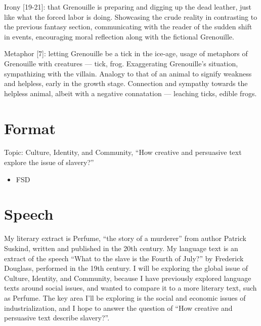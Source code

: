 \documentclass[a4paper,12pt]{article}
\begin{document}
Irony [19-21]: that Grenouille is preparing and digging up the dead leather, just like what the forced labor is doing. Showcasing the crude reality in contrasting to the previous fantasy section, communicating with the reader of the sudden shift in events, encouraging moral reflection along with the fictional Grenouille.

Metaphor [7]: letting Grenouille be a tick in the ice-age, usage of metaphors of Grenouille with creatures --- tick, frog. Exaggerating Grenouille's situation, sympathizing with the villain. Analogy to that of an animal to signify weakness and helpless, early in the growth stage. Connection and sympathy towards the helpless animal, albeit with a negative connatation --- leaching ticks, edible frogs.

\section{Format}

Topic: Culture, Identity, and Community, ``How creative and persuasive text explore the issue of slavery?''
\begin{itemize}
    \item FSD
\end{itemize}

\section{Speech}
My literary extract is Perfume, ``the story of a murderer'' from author Patrick Suskind, written and published in the 20th century. My language text is an extract of the speech ``What to the slave is the Fourth of July?'' by Frederick Douglass, performed in the 19th century. I will be exploring the global issue of Culture, Identity, and Community, because I have previously explored language texts around social issues, and wanted to compare it to a more literary text, such as Perfume. The key area I'll be exploring is the social and economic issues of industrialization, and I hope to answer the question of ``How creative and persuasive text describe slavery?''.
\end{document}
